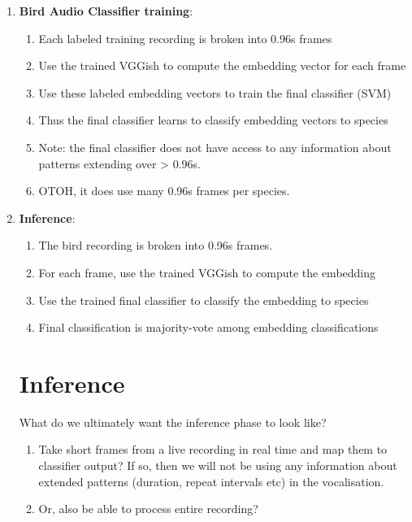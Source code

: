 \documentclass{article}
\begin{document}
\begin{enumerate}
\begin{enumerate}
\item {\bf Bird Audio Classifier training}:
  \begin{enumerate}
  \item Each labeled training recording is broken into 0.96s frames
  \item Use the trained VGGish to compute the embedding vector for each frame
  \item Use these labeled embedding vectors to train the final classifier (SVM)
  \item Thus the final classifier learns to classify embedding vectors to species
  \item Note: the final classifier does not have access to any information about patterns extending over > 0.96s.
  \item OTOH, it does use many 0.96s frames per species.
  \end{enumerate}
\item {\bf Inference}:
  \begin{enumerate}
  \item The bird recording is broken into 0.96s frames.
  \item For each frame, use the trained VGGish to compute the embedding
  \item Use the trained final classifier to classify the embedding to species
  \item Final classification is majority-vote among embedding classifications
  \end{enumerate}


\section{Inference}
What do we ultimately want the inference phase to look like?
\begin{enumerate}
\item Take short frames from a live recording in real time and map them to classifier output?
  If so, then we will not be using any information about extended patterns (duration, repeat intervals etc) in
  the vocalisation.
\item Or, also be able to process entire recording?
\end{enumerate}
\end{enumerate}


\end{enumerate}
\end{document}
